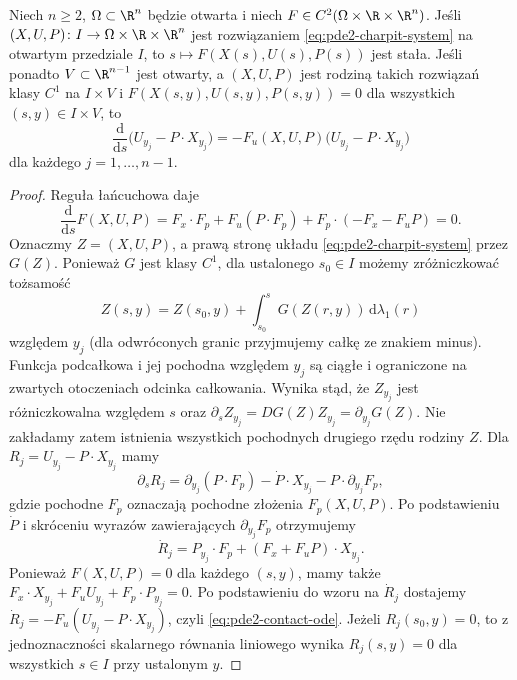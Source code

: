 \begin{lemat}
\label{lem:pde2-contact}
Niech $n\geq2$, $\Omega\subset\R^n$ będzie otwarta
i niech $F\in C^2(\Omega\times\R\times\R^n)$.
Jeśli $(X,U,P)\colon I\to\Omega\times\R\times\R^n$
jest rozwiązaniem \eqref{eq:pde2-charpit-system}
na otwartym przedziale $I$, to
$s\mapsto F(X(s),U(s),P(s))$ jest stała.
Jeśli ponadto $V\subset\R^{n-1}$ jest otwarty,
a $(X,U,P)$ jest rodziną takich rozwiązań klasy $C^1$
na $I\times V$ i $F(X(s,y),U(s,y),P(s,y))=0$
dla wszystkich $(s,y)\in I\times V$, to
\begin{equation}\label{eq:pde2-contact-ode}
 \frac{\mathrm d}{\mathrm ds}
 \bigl(U_{y_j}-P\cdot X_{y_j}\bigr)
 =-F_u(X,U,P)\bigl(U_{y_j}-P\cdot X_{y_j}\bigr)
\end{equation}
dla każdego $j=1,\ldots,n-1$.
\end{lemat}
\begin{proof}
Reguła łańcuchowa daje
\[
 \frac{\mathrm d}{\mathrm ds}F(X,U,P)
 =F_x\cdot F_p+F_u(P\cdot F_p)
 +F_p\cdot(-F_x-F_uP)=0.
\]
Oznaczmy $Z=(X,U,P)$, a prawą stronę układu
\eqref{eq:pde2-charpit-system} przez $G(Z)$.
Ponieważ $G$ jest klasy $C^1$, dla ustalonego $s_0\in I$
możemy zróżniczkować tożsamość
\[
 Z(s,y)=Z(s_0,y)+\int_{s_0}^sG(Z(r,y))\,\mathrm d\lambda_1(r)
\]
względem $y_j$ (dla odwróconych granic przyjmujemy
całkę ze znakiem minus). Funkcja podcałkowa i jej
pochodna względem $y_j$ są ciągłe i ograniczone
na zwartych otoczeniach odcinka całkowania.
Wynika stąd, że $Z_{y_j}$ jest różniczkowalna
względem $s$ oraz
$\partial_s Z_{y_j}=DG(Z)Z_{y_j}=\partial_{y_j}G(Z)$.
Nie zakładamy zatem istnienia wszystkich pochodnych
drugiego rzędu rodziny $Z$.
Dla $R_j=U_{y_j}-P\cdot X_{y_j}$ mamy
\[
 \partial_s R_j
 =\partial_{y_j}(P\cdot F_p)
 -\dot P\cdot X_{y_j}-P\cdot\partial_{y_j}F_p,
\]
gdzie pochodne $F_p$ oznaczają pochodne złożenia
$F_p(X,U,P)$. Po podstawieniu $\dot P$ i skróceniu
wyrazów zawierających $\partial_{y_j}F_p$ otrzymujemy
\[
 \dot R_j=P_{y_j}\cdot F_p+(F_x+F_uP)\cdot X_{y_j}.
\]
Ponieważ $F(X,U,P)=0$ dla każdego $(s,y)$,
mamy także
$F_x\cdot X_{y_j}+F_u U_{y_j}+F_p\cdot P_{y_j}=0$.
Po podstawieniu do wzoru na $\dot R_j$ dostajemy
$\dot R_j=-F_u(U_{y_j}-P\cdot X_{y_j})$, czyli
\eqref{eq:pde2-contact-ode}.
Jeżeli $R_j(s_0,y)=0$, to z jednoznaczności
skalarnego równania liniowego wynika $R_j(s,y)=0$
dla wszystkich $s\in I$ przy ustalonym $y$.
\end{proof}


